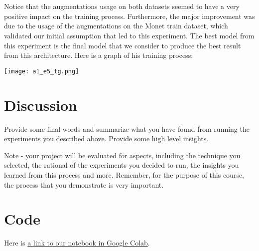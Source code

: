 \documentclass{article}
\begin{document}
\begin{table}[!ht]
    \centering
\end{table}
\\\\
Notice that the augmentations usage on both datasets seemed to have a very positive impact on the training process. Furthermore, the major improvement was due to the usage of the augmentations on the Monet train dataset, which validated our initial assumption that led to this experiment. The best model from this experiment is the final model that we consider to produce the best result from this architecture. Here is a graph of his training process:

\begin{center}
    \texttt{[image: a1\_e5\_tg.png]}
\end{center}

\section{Discussion}
Provide some final words and summarize what you have found from running the experiments you described above. Provide some high level insights.

Note - your project will be evaluated for aspects, including the technique you selected, the rational of the experiments you decided to run, the insights you learned from this process and more. Remember, for the purpose of this course, the process that you demonstrate is very  important.

\section{Code}
Here is \href{https://colab.research.google.com/drive/1O95T3f5k68-do9Ml-EqE1FKqu67zdDw1}{a link to our notebook in Google Colab}.



\end{document}
